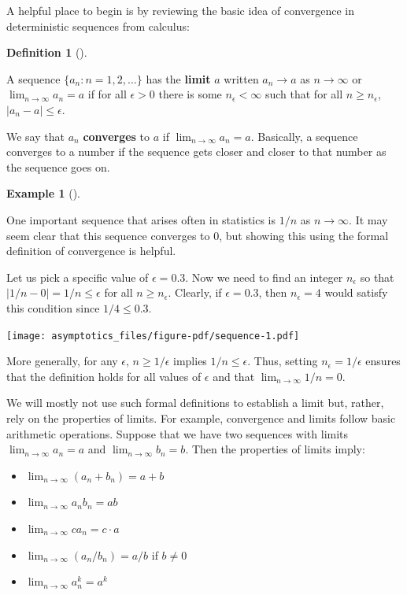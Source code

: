 \documentclass[
  13pt,
  letterpaper,
  DIV=11,
  numbers=noendperiod]{scrreprt}
\providecommand{\tightlist}{%
  \setlength{\itemsep}{0pt}\setlength{\parskip}{0pt}}\usepackage{longtable,booktabs,array}
\theoremstyle{definition}
\newtheorem{definition}{Definition}[chapter]
\theoremstyle{definition}
\newtheorem{example}{Example}[chapter]
\theoremstyle{plain}
\theoremstyle{remark}
\begin{document}
A helpful place to begin is by reviewing the basic idea of convergence
in deterministic sequences from calculus:

\begin{definition}[]\protect\hypertarget{def-limit}{}\label{def-limit}

A sequence \(\{a_n: n = 1, 2, \ldots\}\) has the \textbf{limit} \(a\)
written \(a_n \rightarrow a\) as \(n\rightarrow \infty\) or
\(\lim_{n\rightarrow \infty} a_n = a\) if for all \(\epsilon > 0\) there
is some \(n_{\epsilon} < \infty\) such that for all
\(n \geq n_{\epsilon}\), \(|a_n - a| \leq \epsilon\).

\end{definition}

We say that \(a_n\) \textbf{converges} to \(a\) if
\(\lim_{n\rightarrow\infty} a_n = a\). Basically, a sequence converges
to a number if the sequence gets closer and closer to that number as the
sequence goes on.

\begin{example}[]\protect\hypertarget{exm-limit}{}\label{exm-limit}

One important sequence that arises often in statistics is \(1/n\) as
\(n\to\infty\). It may seem clear that this sequence converges to 0, but
showing this using the formal definition of convergence is helpful.

Let us pick a specific value of \(\epsilon = 0.3\). Now we need to find
an integer \(n_{\epsilon}\) so that \(|1/n - 0| = 1/n \leq \epsilon\)
for all \(n \geq n_{\epsilon}\). Clearly, if \(\epsilon = 0.3\), then
\(n_{\epsilon} = 4\) would satisfy this condition since
\(1/4 \leq 0.3\).

\texttt{[image: asymptotics\_files/figure-pdf/sequence-1.pdf]}

More generally, for any \(\epsilon\), \(n \geq 1/\epsilon\) implies
\(1/n \leq \epsilon\). Thus, setting \(n_{\epsilon} = 1/\epsilon\)
ensures that the definition holds for all values of \(\epsilon\) and
that \(\lim_{n\to\infty} 1/n = 0\).

\end{example}

We will mostly not use such formal definitions to establish a limit but,
rather, rely on the properties of limits. For example, convergence and
limits follow basic arithmetic operations. Suppose that we have two
sequences with limits \(\lim_{n\to\infty} a_n = a\) and
\(\lim_{n\to\infty} b_n = b\). Then the properties of limits imply:

\begin{itemize}
\tightlist
\item
  \(\lim_{n\to\infty} (a_n + b_n) = a + b\)
\item
  \(\lim_{n\to\infty} a_nb_n = ab\)
\item
  \(\lim_{n\to\infty} ca_n = c\cdot a\)
\item
  \(\lim_{n\to\infty} (a_n/b_n) = a/b\) if \(b \neq 0\)
\item
  \(\lim_{n\to\infty} a_n^{k} = a^{k}\)
\end{itemize}
\end{document}
